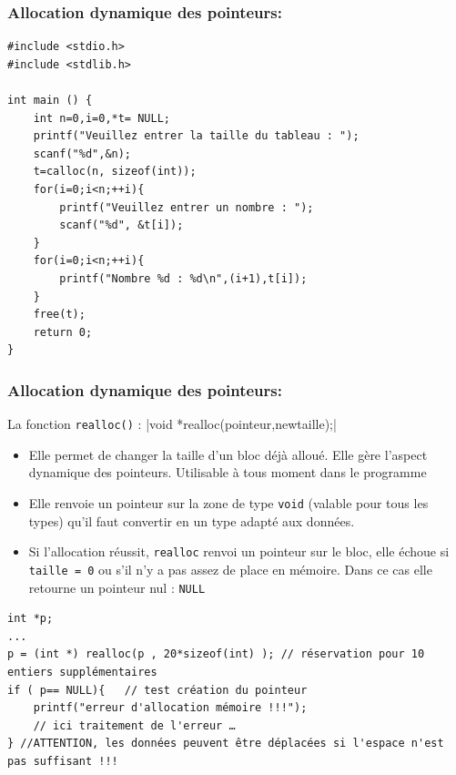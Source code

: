\documentclass{beamer}
\begin{document}
\begin{frame}[fragile]
\frametitle{Allocation dynamique des pointeurs:}
\begin{verbatim}
#include <stdio.h>
#include <stdlib.h>

int main () {
    int n=0,i=0,*t= NULL;
    printf("Veuillez entrer la taille du tableau : ");
    scanf("%d",&n);
    t=calloc(n, sizeof(int));
    for(i=0;i<n;++i){
        printf("Veuillez entrer un nombre : ");
        scanf("%d", &t[i]);
    }
    for(i=0;i<n;++i){
        printf("Nombre %d : %d\n",(i+1),t[i]);
    }
    free(t);
    return 0;
}

\end{verbatim}
\end{frame}

\begin{frame}[fragile]
\frametitle{Allocation dynamique des pointeurs:}
La fonction {\tt realloc()} : 
|void *realloc(pointeur,newtaille);|
\begin{itemize}
\item Elle permet de changer la taille d'un bloc déjà alloué. Elle gère l'aspect dynamique des pointeurs. Utilisable à tous moment dans le programme
\item Elle renvoie un pointeur sur la zone de type {\tt void} (valable pour tous les types) qu'il faut convertir en un type adapté aux données.
\item Si l'allocation réussit, {\tt realloc} renvoi un pointeur sur le bloc, elle échoue si {\tt taille = 0} ou s'il n'y a pas assez de place en mémoire. Dans ce cas elle retourne un pointeur nul : {\tt NULL}
\end{itemize}
\begin{verbatim}
int *p;
...
p = (int *) realloc(p , 20*sizeof(int) ); // réservation pour 10 entiers supplémentaires
if ( p== NULL){   // test création du pointeur	
	printf("erreur d'allocation mémoire !!!");
	// ici traitement de l'erreur …
} //ATTENTION, les données peuvent être déplacées si l'espace n'est pas suffisant !!!
\end{verbatim}
\end{frame}

\end{document}
